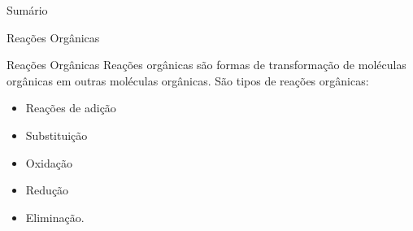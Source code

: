 \documentclass{beamer}
\author{fabio}
\date{\today}
\title{}
\begin{document}
\begin{frame}{Sumário}
\tableofcontents
\end{frame}

\begin{frame}[label={sec:org5143cec}]{Reações Orgânicas}
\begin{block}{Reações Orgânicas}
Reações orgânicas são formas de transformação de moléculas orgânicas em outras moléculas orgânicas. São tipos de reações orgânicas:
\begin{itemize}
\item Reações de adição
\item Substituição
\item Oxidação
\item Redução
\item Eliminação.
\end{itemize}
\end{block}
\end{frame}
\end{document}
